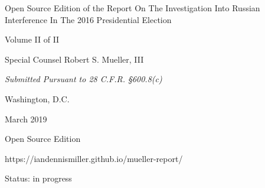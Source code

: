 \thispagestyle{empty}

\begin{center}
\Huge
Open Source Edition of the
Report On The Investigation Into Russian Interference In The 2016 Presidential Election

\vspace{10 mm}

\large
Volume II of II

\vspace{10 mm}

Special Counsel Robert S. Mueller, III

\vspace{10 mm}

\normalsize

\textit{Submitted Pursuant to 28 C.F.R. \S 600.8(c)}

\vspace{20 mm}

Washington, D.C.

\vspace{10 mm}

March 2019

\vspace{10 mm}

\large
Open Source Edition

https://iandennismiller.github.io/mueller-report/

Status: in progress

\end{center}

\newpage
